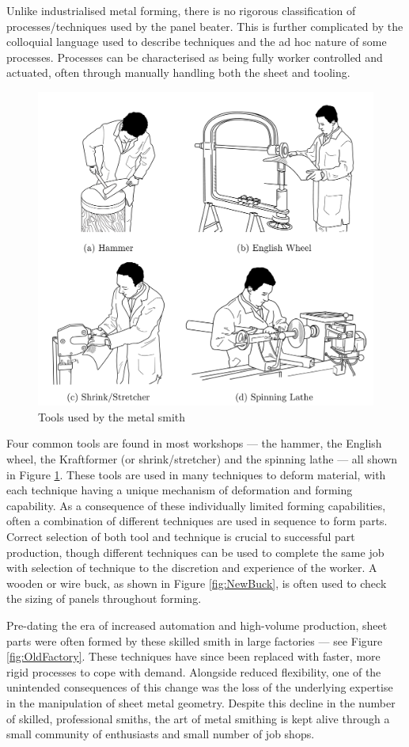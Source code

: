 Unlike industrialised metal forming, there is no rigorous classification of processes/techniques used by the panel beater. This is further complicated by the colloquial language used to describe techniques and the ad hoc nature of some processes. Processes can be characterised as being fully worker controlled and actuated, often through manually handling both the sheet and tooling.

\begin{figure}[h]
    \centering
    \includegraphics[width=0.8\linewidth]{Diagrams/Drawings.pdf}
    \caption{Tools used by the metal smith}
    \label{fig:Drawings}
\end{figure}

Four common tools are found in most workshops --- the hammer, the English wheel, the Kraftformer (or shrink/stretcher) and the spinning lathe --- all shown in Figure \ref{fig:Drawings}. These tools are used in many techniques to deform material, with each technique having a unique mechanism of deformation and forming capability. As a consequence of these individually limited forming capabilities, often a combination of different techniques are used in sequence to form parts. Correct selection of both tool and technique is crucial to successful part production, though different techniques can be used to complete the same job with selection of technique to the discretion and experience of the worker. A wooden or wire buck, as shown in Figure \ref{fig:NewBuck}, is often used to check the sizing of panels throughout forming.

Pre-dating the era of increased automation and high-volume production, sheet parts were often formed by these skilled smith in large factories --- see Figure \ref{fig:OldFactory}. These techniques have since been replaced with faster, more rigid processes to cope with demand. Alongside reduced flexibility, one of the unintended consequences of this change was the loss of the underlying expertise in the manipulation of sheet metal geometry.  Despite this decline in the number of skilled, professional smiths, the art of metal smithing is kept alive through a small community of enthusiasts and small number of job shops. 

